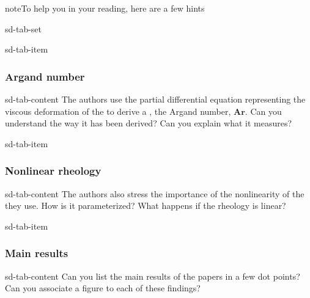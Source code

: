 \documentclass[letterpaper,10pt,english]{jupyterBook}
\begin{document}
\begin{sphinxadmonition}{note}{To help you in your reading, here are a few hints}

\begin{sphinxuseclass}{sd-tab-set}
\begin{sphinxuseclass}{sd-tab-item}\subsubsection*{Argand number}

\begin{sphinxuseclass}{sd-tab-content}
\sphinxAtStartPar
The authors use the partial differential equation representing the viscous deformation of the {\hyperref[\detokenize{glossary:term-Lithosphere}]{}} to derive a {\hyperref[\detokenize{dimension:dimension-section}]{}}, the Argand number, \(\mathbf{Ar}\). Can you understand the way it has been derived? Can you explain what it measures?

\end{sphinxuseclass}
\end{sphinxuseclass}
\begin{sphinxuseclass}{sd-tab-item}\subsubsection*{Non\sphinxhyphen{}linear rheology}

\begin{sphinxuseclass}{sd-tab-content}
\sphinxAtStartPar
The authors also stress the importance of the non\sphinxhyphen{}linearity of the {\hyperref[\detokenize{glossary:term-Rheology}]{}} they use. How is it parameterized? What happens if the rheology is linear?

\end{sphinxuseclass}
\end{sphinxuseclass}
\begin{sphinxuseclass}{sd-tab-item}\subsubsection*{Main results}

\begin{sphinxuseclass}{sd-tab-content}
\sphinxAtStartPar
Can you list the main results of the papers in a few dot points? Can you associate a figure to each of these findings?


\end{sphinxuseclass}
\end{sphinxuseclass}
\end{sphinxuseclass}
\end{sphinxadmonition}
\end{document}
